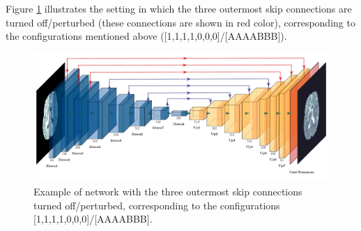 Figure \ref{fig:config_skips} illustrates the setting in which the three outermost skip connections are turned off/perturbed (these connections are shown in red color), corresponding to the configurations mentioned above ([1,1,1,1,0,0,0]/[AAAABBB]).

\begin{figure}[H]
\centering
\includegraphics[height=0.266\textheight]{images/config_skips.pdf}
\caption[Configuration example in Skip Connections Analysis]{Example of network with the three outermost skip connections turned off/perturbed, corresponding to the configurations [1,1,1,1,0,0,0]/[AAAABBB].}
\label{fig:config_skips}
\end{figure}



